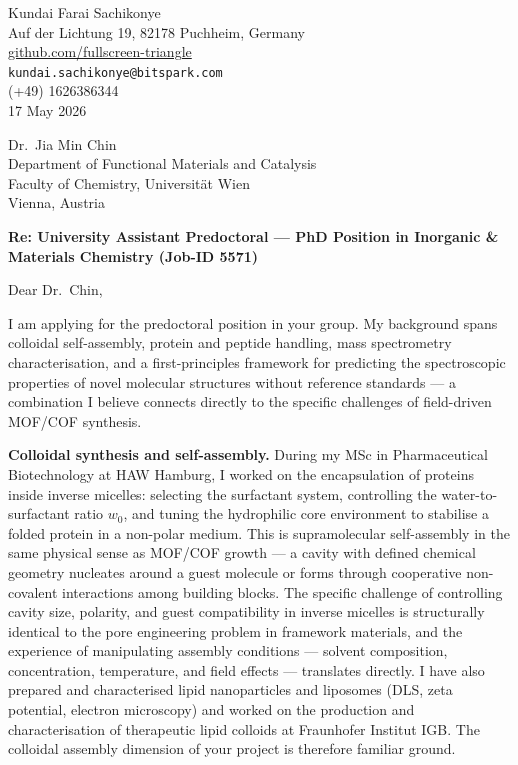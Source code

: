 \documentclass[12pt,a4paper]{article}
\begin{document}
\begin{flushright}
Kundai Farai Sachikonye \\
Auf der Lichtung 19, 82178 Puchheim, Germany \\
\href{https://github.com/fullscreen-triangle}{github.com/fullscreen-triangle} \\
\texttt{kundai.sachikonye@bitspark.com} \\
(+49) 1626386344 \\[6pt]
17 May 2026
\end{flushright}

\vspace{1em}

Dr.\ Jia Min Chin \\
Department of Functional Materials and Catalysis \\
Faculty of Chemistry, Universität Wien \\
Vienna, Austria

\vspace{1.5em}

\textbf{Re: University Assistant Predoctoral --- PhD Position in Inorganic \&
Materials Chemistry (Job-ID 5571)}

\vspace{1em}

Dear Dr.\ Chin,

I am applying for the predoctoral position in your group. My background spans
colloidal self-assembly, protein and peptide handling, mass spectrometry
characterisation, and a first-principles framework for predicting the
spectroscopic properties of novel molecular structures without reference
standards --- a combination I believe connects directly to the specific
challenges of field-driven MOF/COF synthesis.

\textbf{Colloidal synthesis and self-assembly.}
During my MSc in Pharmaceutical Biotechnology at HAW Hamburg, I worked
on the encapsulation of proteins inside inverse micelles: selecting the
surfactant system, controlling the water-to-surfactant ratio $w_0$, and
tuning the hydrophilic core environment to stabilise a folded protein in
a non-polar medium. This is supramolecular self-assembly in the same
physical sense as MOF/COF growth --- a cavity with defined chemical
geometry nucleates around a guest molecule or forms through cooperative
non-covalent interactions among building blocks. The specific challenge
of controlling cavity size, polarity, and guest compatibility in inverse
micelles is structurally identical to the pore engineering problem in
framework materials, and the experience of manipulating assembly conditions
--- solvent composition, concentration, temperature, and field effects ---
translates directly.
I have also prepared and characterised lipid nanoparticles and liposomes
(DLS, zeta potential, electron microscopy) and worked on the production
and characterisation of therapeutic lipid colloids at Fraunhofer Institut IGB.
The colloidal assembly dimension of your project is therefore familiar ground.
\end{document}
